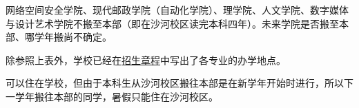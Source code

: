 网络空间安全学院、现代邮政学院（自动化学院）、理学院、人文学院、数字媒体与设计艺术学院不搬至本部（即在沙河校区读完本科四年）。未来学院是否搬至本部、哪学年搬尚不确定。

除参照上表外，学校已经在\href{https://zsb.bupt.edu.cn/info/1005/1992.htm}{招生章程}中写出了各专业的办学地点。


可以住在学校，但由于本科生从沙河校区搬往本部是在新学年开始时进行，所以下一学年搬往本部的同学，暑假只能住在沙河校区。
